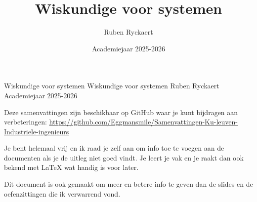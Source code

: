 \documentclass[a4paper,11pt]{report}
\title{Wiskundige voor systemen}
\author{Ruben Ryckaert}
\date{Academiejaar 2025-2026}
\newcommand{\coursename}{Wiskundige voor systemen}
\begin{document}
\kuleuventitle
    {Wiskundige voor systemen}
    {\coursename}
    {Ruben Ryckaert}
    {Academiejaar 2025-2026}

Deze samenvattingen zijn beschikbaar op GitHub waar je 
kunt bijdragen aan verbeteringen: \url{https://github.com/Eggmansmile/Samenvattingen-Ku-leuven-Industriele-ingenieurs}

Je bent helemaal vrij en ik raad je zelf aan om info toe te voegen aan de documenten als je de uitleg niet goed vindt.
Je leert je vak en je raakt dan ook bekend met LaTeX wat handig is voor later.

Dit document is ook gemaakt om meer en betere info te geven dan de slides en de oefenzittingen die
ik verwarrend vond. 

\tableofcontents
\newpage

%
%













\end{document}
